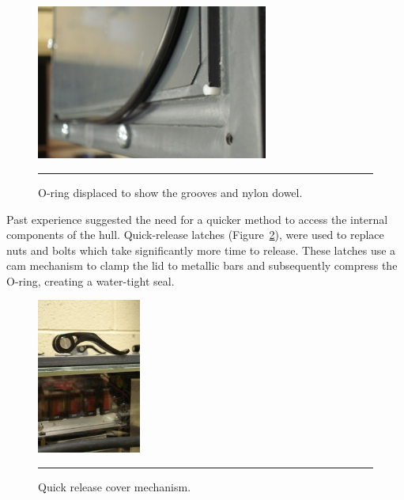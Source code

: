 \begin{figure}
\begin{center}
 \includegraphics[width=3in]{fig/dsc06460} 
\vspace{.05in}
\hrule
\caption{O-ring displaced to show the grooves and nylon dowel.}\label{oring}
\end{center}
\end{figure}

Past experience suggested the need for a quicker method to access the
internal components of the hull.  Quick-release latches 
(Figure~\ref{quick}), were
used to replace nuts and bolts which take significantly more time to
release.  These latches use a cam mechanism to clamp the lid to
metallic bars and subsequently compress the O-ring, creating a water-tight seal.

\begin{figure}
\begin{center}
 \includegraphics[width=1.34in]{fig/dsc06462} 
\vspace{.05in}
\hrule
\caption{Quick release cover mechanism.}\label{quick}
\end{center}
\end{figure}

